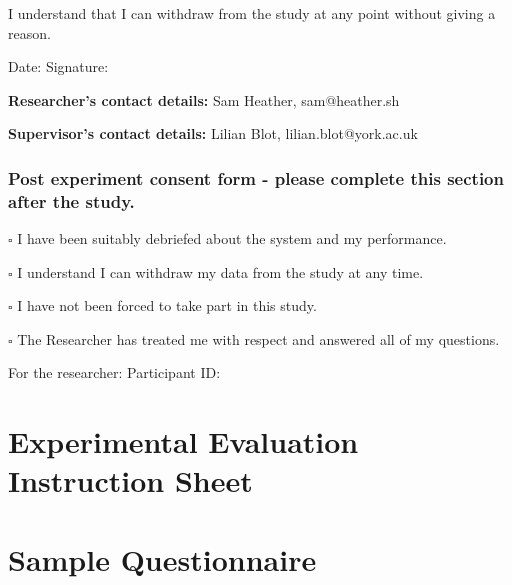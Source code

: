 \documentclass[authoryearcitations]{UoYCSproject}
\begin{document}
{I understand that I can withdraw from the study at any point without giving a reason.

Date: \textunderscore\textunderscore\textunderscore\textunderscore\textunderscore\textunderscore\textunderscore\textunderscore\textunderscore\textunderscore\textunderscore\textunderscore\textunderscore\textunderscore\textunderscore\textunderscore\textunderscore\textunderscore\textunderscore\textunderscore\textunderscore
Signature: \textunderscore\textunderscore\textunderscore\textunderscore\textunderscore\textunderscore\textunderscore\textunderscore\textunderscore\textunderscore\textunderscore\textunderscore\textunderscore\textunderscore\textunderscore\textunderscore\textunderscore\textunderscore\textunderscore\textunderscore\textunderscore

{\bf Researcher's contact details:} Sam Heather, sam@heather.sh

{\bf Supervisor's contact details:} Lilian Blot, lilian.blot@york.ac.uk

\pagebreak

\subsection*{Post experiment consent form - please complete this section after the study.}
$\square$ I have been suitably debriefed about the system and my performance.

$\square$ I understand I can withdraw my data from the study at any time.

$\square$ I have not been forced to take part in this study.

$\square$ The Researcher has treated me with respect and answered all of my questions.

\vspace{10 mm}

For the researcher: Participant ID: \textunderscore\textunderscore\textunderscore\textunderscore\textunderscore

}

\chapter{Experimental Evaluation Instruction Sheet}
\label{sec:appendixExperimentalInstructions}


\newpage
\chapter{Sample Questionnaire}
\label{sec:appendixQuestionnaire}
\newpage
\end{document}
